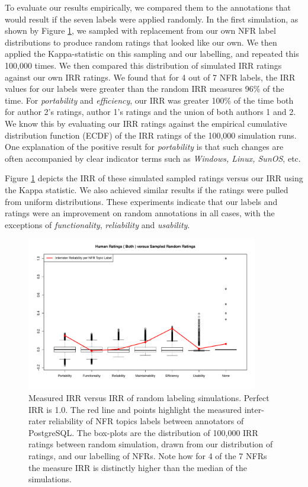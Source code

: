 \documentclass[smallextended]{svjour3}       %
\begin{document}
To evaluate our results empirically, we compared them to the annotations that would result if the seven labels
 were applied randomly. In the first simulation, as shown by Figure \ref{fig:irr},
we sampled with replacement from our own NFR label distributions to
produce random ratings that looked like our own. We then applied the
Kappa-statistic on this sampling and our labelling, and repeated
this 100,000 times. We then compared this distribution of simulated
IRR ratings against our own IRR ratings. We found that
for 4 out of 7 NFR labels, the IRR values for our labels were greater than the random
IRR measures 96\% of the time. For \emph{portability} and \emph{efficiency}, our IRR
was greater 100\% of the time both for author 2's ratings, author 1's ratings
and the union of both authors 1 and 2. 
We know this by evaluating our IRR ratings against the empirical
cumulative distribution function (ECDF) of the IRR ratings of the 100,000
simulation runs.
One explanation of the positive result for \emph{portability} is that such changes are often 
accompanied by clear indicator terms such as \emph{Windows, Linux, SunOS}, etc. 

Figure \ref{fig:irr} depicts the IRR of
these simulated sampled ratings versus our IRR using the Kappa statistic. We also achieved similar results if the ratings were pulled from
uniform distributions. These experiments indicate that our labels and
ratings were an improvement on random annotations in all cases, with the exceptions of \emph{functionality},
\emph{reliability} and \emph{usability}. 


\begin{figure}
  \centering
  \includegraphics[width=0.9\textwidth]{figures/self-sample-Both}
  \caption{Measured IRR versus IRR of random labeling
    simulations. Perfect IRR is 1.0.
    The red line and points highlight the measured inter-rater reliability of
    NFR topics labels between annotators of PostgreSQL.
    The box-plots are the distribution of 100,000 IRR ratings between
    random simulation, drawn from our distribution of ratings, and our
    labelling of NFRs.
    Note how for 4 of the 7 NFRs the measure IRR is
    distinctly higher than the median of the simulations.
  }
  \label{fig:irr}
\end{figure}
\end{document}
